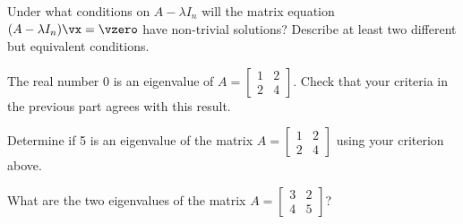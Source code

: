 \begin{activity} \hfill
\ba
\item Under what conditions on $A-\lambda I_n$ will the matrix equation $(A-\lambda I_n)\vx=\vzero$ have non-trivial solutions? Describe at least two different but equivalent conditions. 



\item The real number 0 is an eigenvalue of $A = \left[ \begin{array}{cc} 1&2 \\ 2&4 \end{array} \right]$. Check that your criteria in the previous part agrees with this result.



\item Determine if 5 is an eigenvalue of the matrix $A = \left[ \begin{array}{cc} 1&2 \\ 2&4 \end{array} \right]$ using your criterion above. 

 

%
%




\item What are the two eigenvalues of the matrix $A = \left[ \begin{array}{cc} 3&2\\4&5 \end{array} \right]$?



\ea

\end{activity}



